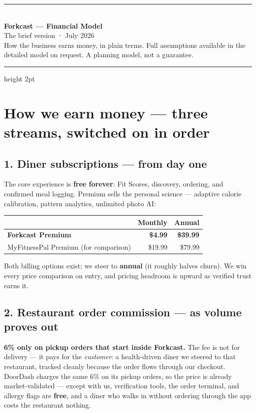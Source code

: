 \documentclass[10pt]{article}
\begin{document}
{\color{accent}\rule{2.6cm}{5pt}}\\[10pt]
{\huge\bfseries \textcolor{accent}{Fork}cast --- Financial Model}\\[4pt]
{\large\color{muted}The brief version · July 2026}\\[2pt]
{\small\color{muted}How the business earns money, in plain terms. Full assumptions available in the detailed model on request. A planning model, not a guarantee.}

\vspace{10pt}
{\color{ground}\hrule height 2pt}

\section{How we earn money --- three streams, switched on in order}

\subsection*{\textcolor{accent}{1.} Diner subscriptions — from day one}
The core experience is \textbf{free forever}: Fit Scores, discovery, ordering, and confirmed meal logging. Premium sells the personal science --- adaptive calorie calibration, pattern analytics, unlimited photo AI:

\begin{center}
\begin{tabular}{lrr}
\toprule
 & \textbf{Monthly} & \textbf{Annual}\\
\midrule
\textbf{Forkcast Premium} & \textbf{\$4.99} & \textbf{\$39.99}\\
MyFitnessPal Premium (for comparison) & \$19.99 & \$79.99\\
\bottomrule
\end{tabular}
\end{center}

Both billing options exist; we steer to \textbf{annual} (it roughly halves churn). We win every price comparison on entry, and pricing headroom is upward as verified trust earns it.

\subsection*{\textcolor{accent}{2.} Restaurant order commission — as volume proves out}
\textbf{6\% only on pickup orders that start inside Forkcast.} The fee is not for delivery --- it pays for the \emph{customer}: a health-driven diner we steered to that restaurant, tracked cleanly because the order flows through our checkout. DoorDash charges the same 6\% on its pickup orders, so the price is already market-validated --- except with us, verification tools, the order terminal, and allergy flags are \textbf{free}, and a diner who walks in without ordering through the app costs the restaurant nothing.
\end{document}
